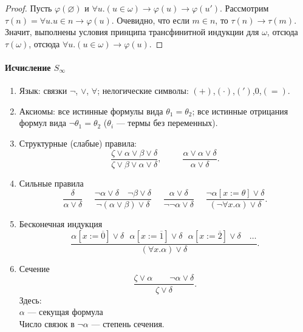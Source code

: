 \begin{proof}
Пусть $\varphi(\varnothing)$ и $\forall u.(u \in \omega) \rightarrow \varphi(u) \rightarrow \varphi(u')$.
Рассмотрим $\tau(n) = \forall u.u \in n \rightarrow \varphi(u)$. Очевидно,
что если $m \in n$, то $\tau(n) \rightarrow \tau(m)$. Значит, выполнены условия принципа
трансфинитной индукции для $\omega$, отсюда $\tau(\omega)$, отсюда $\forall u.(u \in \omega) \rightarrow \varphi(u)$.
\end{proof}


\paragraph{Исчисление $S_\infty$}
\begin{enumerate}
\item Язык: связки $\neg$, $\vee$, $\forall$; нелогические символы: $(+)$,$(\cdot)$,$(')$,$0$,$(=)$.
\item Аксиомы: все истинные формулы вида $\theta_1=\theta_2$; все истинные отрицания формул вида $\neg\theta_1=\theta_2$
($\theta_i$ --- термы без переменных).
\item Структурные (слабые) правила:
\[ \dfrac{\zeta\vee\alpha\vee\beta\vee\delta}{\zeta\vee\beta\vee\alpha\vee\delta}, ~~~~~~~~~~~
\dfrac{\alpha\vee\alpha\vee\delta}{\alpha\vee\delta}. \]

\item Сильные правила
\[\dfrac{\delta}{\alpha\vee\delta}~~~~~~
\dfrac{\neg\alpha\vee\delta\quad\neg\beta\vee\delta}{\neg(\alpha\vee\beta)\vee\delta}~~~~~~
\dfrac{\alpha\vee\delta}{\neg\neg\alpha\vee\delta}~~~~~~
\dfrac{\neg\alpha[x := \theta]\vee\delta}{(\neg\forall x.\alpha)\vee\delta}.\]

\item Бесконечная индукция
\[ \dfrac{\alpha[x:=\overline{0}]\vee\delta~~~
\alpha[x:=\overline{1}]\vee\delta~~~
\alpha[x:=\overline{2}]\vee\delta\quad\dots}{(\forall x.\alpha)\vee\delta}.\]

\item Сечение
\[ \dfrac{\zeta\vee\alpha  \quad\quad \neg\alpha\vee\delta}
{\zeta\vee\delta}. \]
Здесь: \\
$\alpha$ --- секущая формула \\
Число связок в $\neg\alpha$ --- степень сечения.
\end{enumerate}

